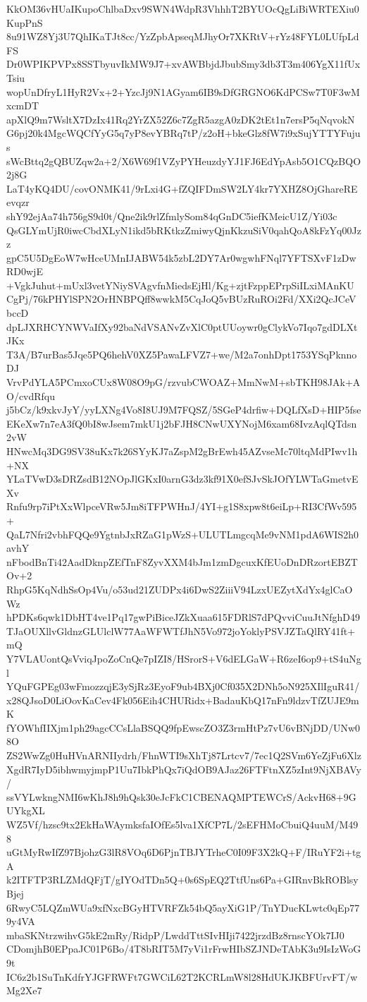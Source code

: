 KkOM36vHUaIKupoChlbaDxv9SWN4WdpR3VhhhT2BYUOcQgLiBiWRTEXiu0KupPnS
8u91WZ8Yj3U7QhIKaTJt8cc/YzZpbApseqMJhyOr7XKRtV+rYz48FYL0LUfpLdFS
Dr0WPIKPVPx8SSTbyuvIkMW9J7+xvAWBbjdJbubSmy3db3T3m406YgX11fUxTsiu
wopUnDfryL1HyR2Vx+2+YzcJj9N1AGyam6IB9sDfGRGNO6KdPCSw7T0F3wMxcmDT
apXlQ9m7WsltX7DzIx41Rq2YrZX52Z6c7ZgR5azgA0zDK2tEt1n7ersP5qNqvokN
G6pj20k4MgcWQCfYyG5q7yP8evYBRq7tP/z2oH+bkeGlz8fW7i9xSujYTTYFujus
sWcBttq2gQBUZqw2a+2/X6W69f1VZyPYHeuzdyYJ1FJ6EdYpAsb5O1CQzBQO2j8G
LaT4yKQ4DU/covONMK41/9rLxi4G+fZQIFDmSW2LY4kr7YXHZ8OjGhareREevqzr
shY92ejAa74h756gS9d0t/Qne2ik9rlZfmlySom84qGnDC5iefKMeicU1Z/Yi03c
QsGLYmUjR0iwcCbdXLyN1ikd5bRKtkzZmiwyQjnKkzuSiV0qahQoA8kFzYq00Jzz
gpC5U5DgEoW7wHceUMnIJABW54k5zbL2DY7Ar0wgwhFNql7YFTSXvF1zDwRD0wjE
+VgkJuhut+mUxl3vetYNiySVAgvfnMiedsEjHl/Kg+zjtFzppEPrpSiILxiMAnKU
CgPj/76kPHYlSPN2OrHNBPQff8wwkM5CqJoQ5vBUzRuROi2Fd/XXi2QcJCeVbccD
dpLJXRHCYNWVaIfXy92baNdVSANvZvXlC0ptUUoywr0gClykVo7Iqo7gdDLXtJKx
T3A/B7urBas5Jqe5PQ6hehV0XZ5PawaLFVZ7+we/M2a7onhDpt1753YSqPknnoDJ
VrvPdYLA5PCmxoCUx8W08O9pG/rzvubCWOAZ+MmNwM+sbTKH98JAk+AO/cvdRfqu
j5bCz/k9xkvJyY/yyLXNg4Vo8I8UJ9M7FQSZ/5SGeP4drfiw+DQLfXsD+HIP5fse
EKeXw7n7eA3fQ0bI8wJsem7mkU1j2bFJH8CNwUXYNojM6xam68IvzAqlQTdsn2vW
HNwcMq3DG9SV38uKx7k26SYyKJ7aZspM2gBrEwh45AZvseMc70ltqMdPIwv1h+NX
YLaTVwD3sDRZsdB12NOpJlGKxI0arnG3dz3kf91X0efSJvSkJOfYLWTaGmetvEXv
Rnfu9rp7iPtXxWlpceVRw5Jm8iTFPWHnJ/4YI+g1S8xpw8t6eiLp+RI3CfWv595+
QaL7Nfri2vbhFQQe9YgtnbJxRZaG1pWzS+ULUTLmgcqMe9vNM1pdA6WIS2h0avhY
nFbodBnTi42AadDknpZEfTnF8ZyvXXM4bJm1zmDgcuxKfEUoDnDRzortEBZTOv+2
RhpG5KqNdhSsOp4Vu/o53ud21ZUDPx4i6DwS2ZiiiV94LzxUEZytXdYx4glCaOWz
hPDKs6qwk1DbHT4ve1Pq17gwPiBiceJZkXuaa615FDRlS7dPQvviCuuJtNfghD49
TJaOUXllvGldnzGLUlclW77AaWFWTfJhN5Vo972joYoklyPSVJZTaQlRY41ft+mQ
Y7VLAUontQsVviqJpoZoCnQe7pIZI8/HSrorS+V6dELGaW+R6zeI6op9+tS4uNgl
YQuFGPEg03wFmozzqjE3ySjRz3EyoF9ub4BXj0Cf035X2DNh5oN925XIlIguR41/
x28QJsoD0LiOovKaCev4Fk056Eih4CHURidx+BadauKbQ17nFn9ldzvTfZUJE9mK
fYOWhfIIXjm1ph29agcCCsLlaBSQQ9fpEwscZO3Z3rmHtPz7vU6vBNjDD/UNw08O
ZS2WwZg0HuHVnARNIIydrh/FhnWTI9sXhTj87Lrtcv7/7ec1Q2SVm6YeZjFu6Xlz
XgdR7IyD5ibhwmyjmpP1Uu7IbkPhQx7iQdOB9AJaz26FTFtnXZ5zInt9NjXBAVy/
ssVYLwkngNMI6wKhJ8h9hQsk30eJcFkC1CBENAQMPTEWCrS/AckvH68+9GUYkgXL
WZ5Vf/hzsc9tx2EkHaWAymksfaIOfEs5lva1XfCP7L/2sEFHMoCbuiQ4uuM/M498
uGtMyRwIfZ97BjohzG3lR8VOq6D6PjnTBJYTrheC0I09F3X2kQ+F/IRuYF2i+tgA
k2ITFTP3RLZMdQFjT/gIYOdTDn5Q+0s6SpEQ2TtfUns6Pa+GIRnvBkROBlsyBjej
6RwyC5LQZmWUa9xfNxcBGyHTVRFZk54bQ5ayXiG1P/TnYDucKLwtc0qEp779y4VA
mbaSKNtrzwihvG5kE2mRy/RidpP/LwddTttSIvHIji7422jrzdBz8rnscYOk7IJ0
CDomjhB0EPpaJC01P6Bo/4T8bRIT5M7yVi1rFrwHIbSZJNDeTAbK3u9IsIzWoG9t
IC6z2b1SuTnKdfrYJGFRWFt7GWCiL62T2KCRLmW8l28HdUKJKBFUrvFT/wMg2Xe7
